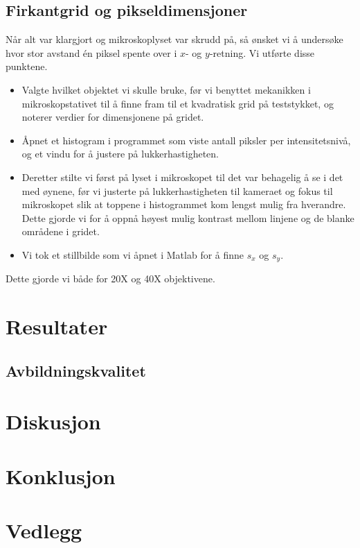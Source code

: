 \documentclass[a4paper,11pt, twocolumn]{article}
\begin{document}
\subsection{Firkantgrid og pikseldimensjoner}
Når alt var klargjort og mikroskoplyset var skrudd på, så ønsket vi å undersøke hvor stor avstand \'en piksel spente over i $x$- og $y$-retning. Vi utførte disse punktene.

\begin{itemize}
	\item Valgte hvilket objektet vi skulle bruke, før vi benyttet mekanikken i mikroskopstativet til å finne fram til et kvadratisk grid på teststykket, og noterer verdier for dimensjonene på gridet.
	\item Åpnet et histogram i programmet som viste antall piksler per intensitetsnivå, og et vindu for å justere på lukkerhastigheten.
	\item Deretter stilte vi først på lyset i mikroskopet til det var behagelig å se i det med øynene, før vi justerte på lukkerhastigheten til kameraet og fokus til mikroskopet slik at toppene i histogrammet kom lengst mulig fra hverandre. Dette gjorde vi for å oppnå høyest mulig kontrast mellom linjene og de blanke områdene i gridet.
	\item Vi tok et stillbilde som vi åpnet i Matlab for å finne $s_x$ og $s_y$. 
\end{itemize}

Dette gjorde vi både for 20X og 40X objektivene.

\section{Resultater}
\subsection{Avbildningskvalitet}
\section{Diskusjon}
\section{Konklusjon}

\printbibliography{}
\clearpage
\onecolumn
\appendix

\section{Vedlegg}
\end{document}
